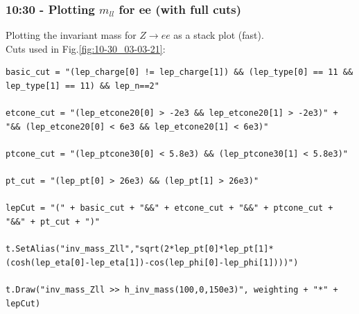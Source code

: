 \subsubsection*{10:30 - Plotting $m_{ll}$ for ee (with full cuts)}
Plotting the invariant mass for $Z \rightarrow ee$ as a stack plot (fast).
\\
Cuts used in Fig.\ref{fig:10-30_03-03-21}:
\begin{lstlisting}
basic_cut = "(lep_charge[0] != lep_charge[1]) && (lep_type[0] == 11 && lep_type[1] == 11) && lep_n==2"

etcone_cut = "(lep_etcone20[0] > -2e3 && lep_etcone20[1] > -2e3)" + "&& (lep_etcone20[0] < 6e3 && lep_etcone20[1] < 6e3)"

ptcone_cut = "(lep_ptcone30[0] < 5.8e3) && (lep_ptcone30[1] < 5.8e3)"

pt_cut = "(lep_pt[0] > 26e3) && (lep_pt[1] > 26e3)"
    
lepCut = "(" + basic_cut + "&&" + etcone_cut + "&&" + ptcone_cut + "&&" + pt_cut + ")"
    
t.SetAlias("inv_mass_Zll","sqrt(2*lep_pt[0]*lep_pt[1]*(cosh(lep_eta[0]-lep_eta[1])-cos(lep_phi[0]-lep_phi[1])))")
  
t.Draw("inv_mass_Zll >> h_inv_mass(100,0,150e3)", weighting + "*" + lepCut)
\end{lstlisting}
